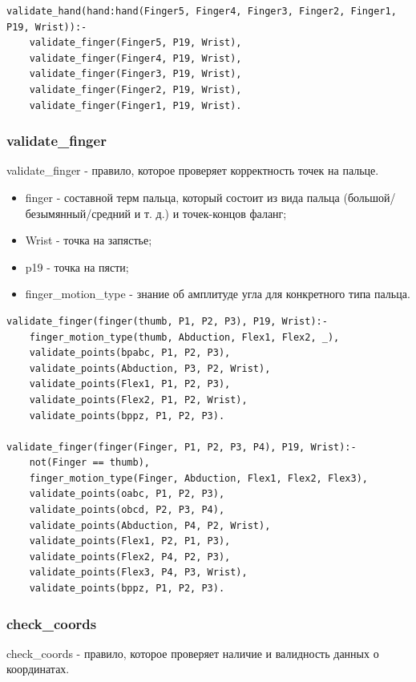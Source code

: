\begin{lstlisting}[caption=Реализация правила validate\_hand, label=rules:validatehand]
validate_hand(hand:hand(Finger5, Finger4, Finger3, Finger2, Finger1, P19, Wrist)):-
	validate_finger(Finger5, P19, Wrist),
	validate_finger(Finger4, P19, Wrist),
	validate_finger(Finger3, P19, Wrist),
	validate_finger(Finger2, P19, Wrist),
	validate_finger(Finger1, P19, Wrist).
\end{lstlisting}

\subsubsection{validate\_finger}
\hspace{0.6cm} validate\_finger - правило, которое проверяет корректность точек на пальце.

\begin{itemize}
	\item finger - составной терм пальца, который состоит из вида пальца (большой/безымянный/средний и т. д.) и точек-концов фаланг;
	\item Wrist - точка на запястье;
	\item p19 - точка на пясти;
	\item finger\_motion\_type - знание об амплитуде угла для конкретного типа пальца.
\end{itemize}

\begin{lstlisting}[caption=Реализация правила validate\_finger, label=rules:validatefinger]
validate_finger(finger(thumb, P1, P2, P3), P19, Wrist):-
	finger_motion_type(thumb, Abduction, Flex1, Flex2, _),
	validate_points(bpabc, P1, P2, P3),
	validate_points(Abduction, P3, P2, Wrist),
	validate_points(Flex1, P1, P2, P3),
	validate_points(Flex2, P1, P2, Wrist),
	validate_points(bppz, P1, P2, P3).
	
validate_finger(finger(Finger, P1, P2, P3, P4), P19, Wrist):-
	not(Finger == thumb),
	finger_motion_type(Finger, Abduction, Flex1, Flex2, Flex3),
	validate_points(oabc, P1, P2, P3),
	validate_points(obcd, P2, P3, P4),
	validate_points(Abduction, P4, P2, Wrist),
	validate_points(Flex1, P2, P1, P3),
	validate_points(Flex2, P4, P2, P3),
	validate_points(Flex3, P4, P3, Wrist),
	validate_points(bppz, P1, P2, P3).
\end{lstlisting}

\subsubsection{check\_coords}
\hspace{0.6cm} check\_coords - правило, которое проверяет наличие и валидность данных о координатах.

